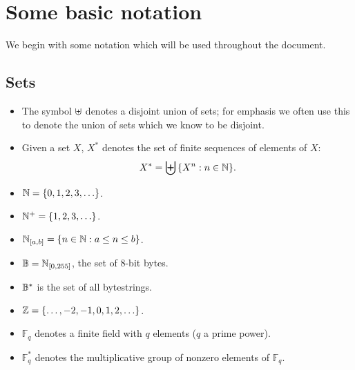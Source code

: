 \section{Some basic notation}
We begin with some notation which will be used throughout the document.

\subsection{Sets}
\label{sec:notation-sets}
\begin{itemize}
  \item The symbol $\uplus$ denotes a disjoint union of sets;  for emphasis we often use this
    to denote the union of sets which we know to be disjoint.%

  \item Given a set $X$, $X^*$ denotes the set of finite sequences of elements of $X$:
    $$
    X^*= \biguplus{\{X^n: n \in \mathbb{N}\}}.
    $$
  \item $\mathbb{N} = \{0,1,2,3,\ldots\}$.%

  \item $\mathbb{N}^{+} = \{1,2,3,\ldots\}$.%

  \item $\mathbb{N}_{[a,b]} = \{n \in \mathbb{N}: a \leq n \leq b\}$.%

  \item $\mathbb{B} = \mathbb{N}_{[0,255]}$, the set of 8-bit bytes.%

  \item $\mathbb{B}^*$ is the set of all bytestrings.%

  \item $\mathbb{Z} = \{\ldots, -2, -1, 0, 1, 2, \ldots\}$.%

  \item $\mathbb{F}_q$ denotes a finite field with $q$ elements ($q$ a prime power).%

  \item $\mathbb{F}_q^*$ denotes the multiplicative group of nonzero elements of $\mathbb{F}_q$.%


\end{itemize}
